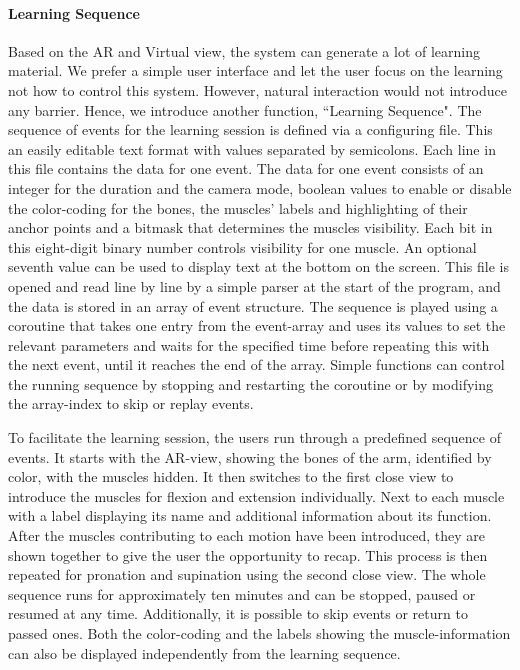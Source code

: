 \paragraph{Learning Sequence}
Based on the AR and Virtual view, the system can generate a lot of learning material. We prefer a simple user interface and let the user focus on the learning not  how to control this system. However, natural interaction would not introduce any barrier. Hence, we introduce another function, ``Learning Sequence".
The sequence of events for the learning session is defined via a configuring file. This an easily editable text format with values separated by semicolons. Each line in this file contains the data for one event. The data for one event consists of an integer for the duration and the camera mode, boolean values to enable or disable the color-coding for the bones, the muscles' labels and highlighting of their anchor points and a bitmask that determines the muscles visibility. Each bit in this eight-digit binary number controls visibility for one muscle. An optional seventh value can be used to display text at the bottom on the screen. 
This file is opened and read line by line by a simple parser at the start of the program, and the data is stored in an array of event structure. 
The sequence is played using a coroutine that takes one entry from the event-array and uses its values to set the relevant parameters and waits for the specified time before repeating this with the next event, until it reaches the end of the array. Simple functions can control the running sequence by stopping and restarting the coroutine or by modifying the array-index to skip or replay events.

To facilitate the learning session, the users run through a predefined sequence of events. It starts with the AR-view, showing the bones of the arm, identified by color, with the muscles hidden. It then switches to the first close view to introduce the muscles for flexion and extension individually. Next to each muscle with a label displaying its name and additional information about its function. After the muscles contributing to each motion have been introduced, they are shown together to give the user the opportunity to recap. This process is then repeated for pronation and supination using the second close view. 
The whole sequence runs for approximately ten minutes and can be stopped, paused or resumed at any time. Additionally, it is possible to skip events or return to passed ones. Both the color-coding and the labels showing the muscle-information can also be displayed independently from the learning sequence.

